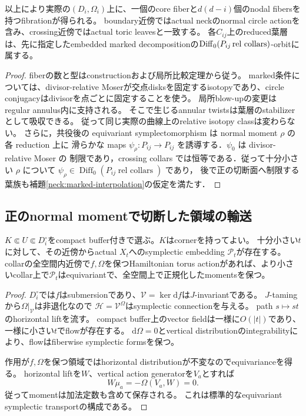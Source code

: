 \begin{proposition}\label{glue:components}
以上により実際の$(D_i,\Omega_i)$上に、一個のcore fiberと$d(d-i)$個のnodal fibersを持つfibrationが得られる。
boundary近傍ではactual neckのnormal circle actionを含み、crossing近傍ではactual toric leavesと一致する。
各$C_{ij}$上のreduced葉層は、先に指定したembedded marked decompositionの$\Diff_0(P_{ij}\operatorname{ rel\ collars})$-orbitに属する。
\end{proposition}
\begin{proof}
fiberの数と型はconstructionおよび局所比較定理から従う。
marked条件については、divisor-relative Moserが交点disksを固定するisotopyであり、circle conjugacyはdivisorを点ごとに固定することを使う。
局所blow-upの変更はregular annulus内に支持される。
そこで生じるannular twistsは葉層のstabilizerとして吸収できる。
従って同じ実際の曲線上のrelative isotopy classは変わらない。
さらに，共役後の equivariant symplectomorphism は normal moment $\rho$ の各 reduction 上に
滑らかな maps $\psi_\rho:P_{ij}\to P_{ij}$ を誘導する．$\psi_0$ は divisor-relative Moser の
制限であり，crossing collars では恒等である．従って十分小さい $\rho$ について
$\psi_\rho\in\operatorname{Diff}_0(P_{ij}\operatorname{ rel\ collars})$ であり，
後で正の切断面へ制限する葉族も補題\ref{neck:marked-interpolation}の仮定を満たす．
\end{proof}

\subsection{正のnormal momentで切断した領域の輸送}
\begin{lemma}\label{glue:transport}
$K\Subset U\Subset D_i^{\circ}$をcompact buffer付きで選ぶ。$K$はcornerを持ってよい。
十分小さい$t$に対して、その近傍からactual $X_t$へのsymplectic embedding $\mathcal P_t$が存在する。
collarの全空間内近傍で$f,\Omega$を保つHamiltonian torus actionがあれば、より小さいcollar上で$\mathcal P_t$はequivariantで、全空間上で正規化したmomentsを保つ。
\end{lemma}
\begin{proof}
$D_i^{\circ}$では$f$はsubmersionであり、$\mathcal V=\ker\mathrm df$は$J$-invariantである。
$J$-tamingから$\Omega|_{\mathcal V}$は非退化なので
$\mathcal H=\mathcal V^\Omega$はsymplectic connectionを与える。
path $s\mapsto st$のhorizontal liftを流す。
compact buffer上のvector fieldは一様に$O(|t|)$であり、一様に小さい$t$でflowが存在する。
$\mathrm d\Omega=0$とvertical distributionのintegrabilityにより、flowはfiberwise symplectic formsを保つ。

作用が$f,\Omega$を保つ領域ではhorizontal distributionが不変なのでequivarianceを得る。
horizontal liftを$W$、vertical action generatorを$V_a$とすれば
\[
W\mu_a=-\Omega(V_a,W)=0.
\]
従ってmomentは加法定数も含めて保存される。
これは標準的なequivariant symplectic transportの構成である\cite{EvansNotes}。
\end{proof}

